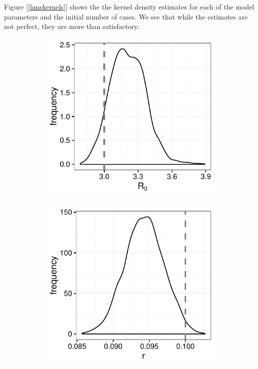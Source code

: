     Figure [\ref{hmckernels}] shows the the kernel density estimates for each of the model parameters and the initial number of cases. We see that while the estimates are not perfect, they are more than satisfactory.

    \begin{figure}
    	\centering
    	\captionsetup{width=0.8\linewidth}
        \begin{subfigure}[tl]{0.4\textwidth}
            \includegraphics[width=\textwidth]{./images/kernelR0.pdf}
        \end{subfigure}
        \begin{subfigure}[tr]{0.4\textwidth}
            \includegraphics[width=\textwidth]{./images/kernelr.pdf}

\end{subfigure}
\end{figure}
